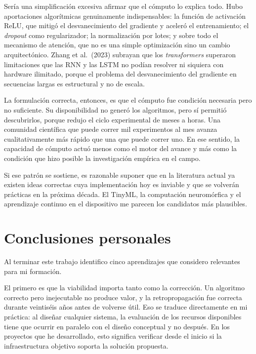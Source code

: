 \documentclass[12pt,letterpaper,oneside]{article}
\begin{document}
Sería una simplificación excesiva afirmar que el cómputo lo explica todo. Hubo aportaciones algorítmicas genuinamente indispensables: la función de activación ReLU, que mitigó el desvanecimiento del gradiente y aceleró el entrenamiento; el \textit{dropout} como regularizador; la normalización por lotes; y sobre todo el mecanismo de atención, que no es una simple optimización sino un cambio arquitectónico. Zhang et al.\ (2023) subrayan que los \textit{transformers} superaron limitaciones que las RNN y las LSTM no podían resolver ni siquiera con hardware ilimitado, porque el problema del desvanecimiento del gradiente en secuencias largas es estructural y no de escala.

La formulación correcta, entonces, es que el cómputo fue condición necesaria pero no suficiente. Su disponibilidad no generó los algoritmos, pero sí permitió descubrirlos, porque redujo el ciclo experimental de meses a horas. Una comunidad científica que puede correr mil experimentos al mes avanza cualitativamente más rápido que una que puede correr uno. En ese sentido, la capacidad de cómputo actuó menos como el motor del avance y más como la condición que hizo posible la investigación empírica en el campo.

Si ese patrón se sostiene, es razonable suponer que en la literatura actual ya existen ideas correctas cuya implementación hoy es inviable y que se volverán prácticas en la próxima década. El TinyML, la computación neuromórfica y el aprendizaje continuo en el dispositivo me parecen los candidatos más plausibles.


\section{Conclusiones personales}

Al terminar este trabajo identifico cinco aprendizajes que considero relevantes para mi formación.

El primero es que la viabilidad importa tanto como la corrección. Un algoritmo correcto pero inejecutable no produce valor, y la retropropagación fue correcta durante veintiséis años antes de volverse útil. Eso se traduce directamente en mi práctica: al diseñar cualquier sistema, la evaluación de los recursos disponibles tiene que ocurrir en paralelo con el diseño conceptual y no después. En los proyectos que he desarrollado, esto significa verificar desde el inicio si la infraestructura objetivo soporta la solución propuesta.
\end{document}
